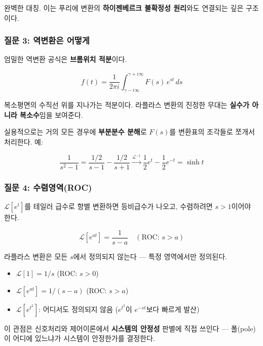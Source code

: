 \documentclass[11pt,a4paper]{article}
\begin{document}
완벽한 대칭. 이는 푸리에 변환의 \textbf{하이젠베르크 불확정성 원리}와도 연결되는 깊은 구조이다.

\subsubsection{질문 3: 역변환은 어떻게}

엄밀한 역변환 공식은 \textbf{브롬위치 적분}이다.

\begin{equation}
f(t) = \frac{1}{2\pi i}\int_{\gamma - i\infty}^{\gamma + i\infty} F(s)\, e^{st}\, ds
\end{equation}

복소평면의 수직선 위를 지나가는 적분이다. 라플라스 변환의 진정한 무대는 \textbf{실수가 아니라 복소수}임을 보여준다.

실용적으로는 거의 모든 경우에 \textbf{부분분수 분해}로 $F(s)$를 변환표의 조각들로 쪼개서 처리한다. 예:

\begin{equation}
\frac{1}{s^2 - 1} = \frac{1/2}{s-1} - \frac{1/2}{s+1} \xrightarrow{\mathcal{L}^{-1}} \frac{1}{2}e^t - \frac{1}{2}e^{-t} = \sinh t
\end{equation}

\subsubsection{질문 4: 수렴영역(ROC)}

$\mathcal{L}[e^t]$를 테일러 급수로 항별 변환하면 등비급수가 나오고, 수렴하려면 $s > 1$이어야 한다.

\begin{equation}
\mathcal{L}[e^{at}] = \frac{1}{s-a} \quad (\text{ROC: } s > a)
\end{equation}

라플라스 변환은 모든 $s$에서 정의되지 않는다 --- 특정 영역에서만 정의된다.

\begin{itemize}
\item $\mathcal{L}[1] = 1/s$ (ROC: $s > 0$)
\item $\mathcal{L}[e^{at}] = 1/(s-a)$ (ROC: $s > a$)
\item $\mathcal{L}[e^{t^2}]$: 어디서도 정의되지 않음 ($e^{t^2}$이 $e^{-st}$보다 빠르게 발산)
\end{itemize}

이 관점은 신호처리와 제어이론에서 \textbf{시스템의 안정성} 판별에 직접 쓰인다 --- 폴(pole)이 어디에 있느냐가 시스템이 안정한가를 결정한다.
\end{document}

